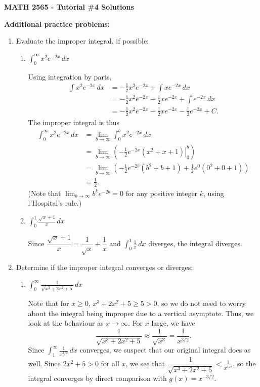 \documentclass[12pt]{article}
\newcommand{\di}{\displaystyle}
\begin{document}
\author{Instructor: Sean Fitzpatrick}
\thispagestyle{empty}
\begin{center}
{\bf MATH 2565 - Tutorial \#4 Solutions}
\end{center}


\textbf{Additional practice problems:}
\begin{enumerate}
\item Evaluate the improper integral, if possible:

\begin{enumerate}
 \item $\di \int_0^\infty x^2e^{-2x}\,dx$
 
 Using integration by parts,
 \begin{align*}
  \int x^2e^{-2x}\,dx &= -\frac12 x^2e^{-2x}+\int xe^{-2x}\,dx\\
  & = -\frac12 x^2e^{-2x} -\frac12 xe^{-2x}+\int e^{-2x}\,dx\\
  & = -\frac12 x^2e^{-2x}-\frac12 xe^{-2x}-\frac12 e^{-2x}+C.
 \end{align*}
The improper integral is thus
\begin{align*}
\int_0^\infty x^2e^{-2x}\,dx &= \lim_{b\to\infty}\int_0^b x^2e^{-2x}\,dx\\
& = \lim_{b\to\infty}\left(\left.-\frac12 e^{-2x}(x^2+x+1)\right|_0^b\right)\\
& = \lim_{b\to \infty}\left(-\frac12 e^{-2b}(b^2+b+1)+\frac12 e^0(0^2+0+1)\right)\\
& = \frac12.
\end{align*}
(Note that $\lim_{b\to\infty}b^ke^{-2b}=0$ for any positive integer $k$, using l'Hospital's rule.)

 \item $\di \int_0^1 \frac{\sqrt{x}+1}{x}\,dx$
 
 Since $\dfrac{\sqrt{x}+1}{x}=\dfrac{1}{\sqrt{x}}+\dfrac{1}{x}$ and $\di\int_0^1 \frac1x \,dx$ diverges, the integral diverges.
 \end{enumerate}  

 \item Determine if the improper integral converges or diverges:

 \begin{enumerate}
  \item $\di \int_0^\infty \frac{1}{\sqrt{x^3+2x^2+5}}\,dx$
  
  Note that for $x\geq 0$, $x^3+2x^2+5\geq 5>0$, so we do not need to worry about the integral being improper due to a vertical asymptote. Thus, we look at the behaviour as $x\to \infty$. For $x$ large, we have
  \[
  \frac{1}{\sqrt{x^3+2x^2+5}} \approx \frac{1}{\sqrt{x^3}}=\frac{1}{x^{3/2}}.
  \]
  Since $\int_1^\infty \frac{1}{x^{3/2}}\,dx$ converges, we suspect that our original integral does as well. Since $2x^2+5>0$ for all $x$, we see that $\dfrac{1}{\sqrt{x^3+2x^2+5}} <\frac{1}{x^{3/2}}$, so the integral converges by direct comparison with $g(x)=x^{-3/2}$.
  

\end{enumerate}
\end{enumerate}
\end{document}
